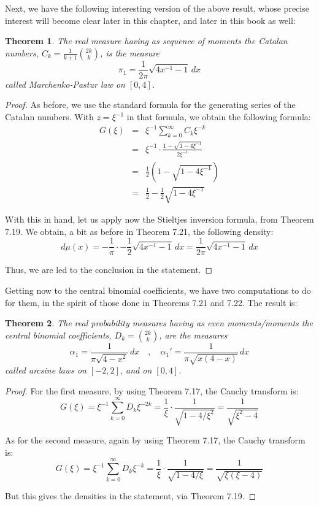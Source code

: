 \documentclass[12pt]{amsbook}
\newtheorem{theorem}{Theorem}[chapter]
\begin{document}
Next, we have the following interesting version of the above result, whose precise interest will become clear later in this chapter, and later in this book as well:


\begin{theorem}
The real measure having as sequence of moments the Catalan numbers, $C_k=\frac{1}{k+1}\binom{2k}{k}$, is the measure
$$\pi_1=\frac{1}{2\pi}\sqrt{4x^{-1}-1}\,dx$$
called Marchenko-Pastur law on $[0,4]$.
\end{theorem}

\begin{proof}
As before, we use the standard formula for the generating series of the Catalan numbers. With $z=\xi^{-1}$ in that formula, we obtain the following formula:
\begin{eqnarray*}
G(\xi)
&=&\xi^{-1}\sum_{k=0}^\infty C_k\xi^{-k}\\
&=&\xi^{-1}\cdot\frac{1-\sqrt{1-4\xi^{-1}}}{2\xi^{-1}}\\
&=&\frac{1}{2}\left(1-\sqrt{1-4\xi^{-1}}\right)\\
&=&\frac{1}{2}-\frac{1}{2}\sqrt{1-4\xi^{-1}}
\end{eqnarray*}

With this in hand, let us apply now the Stieltjes inversion formula, from Theorem 7.19. We obtain, a bit as before in Theorem 7.21, the following density:
$$d\mu(x)
=-\frac{1}{\pi}\cdot-\frac{1}{2}\sqrt{4x^{-1}-1}\,dx
=\frac{1}{2\pi}\sqrt{4x^{-1}-1}\,dx$$

Thus, we are led to the conclusion in the statement.
\end{proof}

Getting now to the central binomial coefficients, we have two computations to do for them, in the spirit of those done in Theorems 7.21 and 7.22. The result is:


\begin{theorem}
The real probability measures having as even moments/moments the central binomial coefficients, $D_k=\binom{2k}{k}$, are the measures
$$\alpha_1=\frac{1}{\pi\sqrt{4-x^2}}\,dx\quad,\quad\alpha_1'=\frac{1}{\pi\sqrt{x(4-x)}}\,dx$$
called arcsine laws on $[-2,2]$, and on $[0,4]$.
\end{theorem}

\begin{proof}
For the first measure, by using Theorem 7.17, the Cauchy transform is:
$$G(\xi)
=\xi^{-1}\sum_{k=0}^\infty D_k\xi^{-2k}
=\frac{1}{\xi}\cdot\frac{1}{\sqrt{1-4/\xi^2}}
=\frac{1}{\sqrt{\xi^2-4}}$$

As for the second measure, again by using Theorem 7.17, the Cauchy transform is:
$$G(\xi)
=\xi^{-1}\sum_{k=0}^\infty D_k\xi^{-k}
=\frac{1}{\xi}\cdot\frac{1}{\sqrt{1-4/\xi}}
=\frac{1}{\sqrt{\xi(\xi-4)}}$$

But this gives the densities in the statement, via Theorem 7.19. 
\end{proof}
\end{document}
